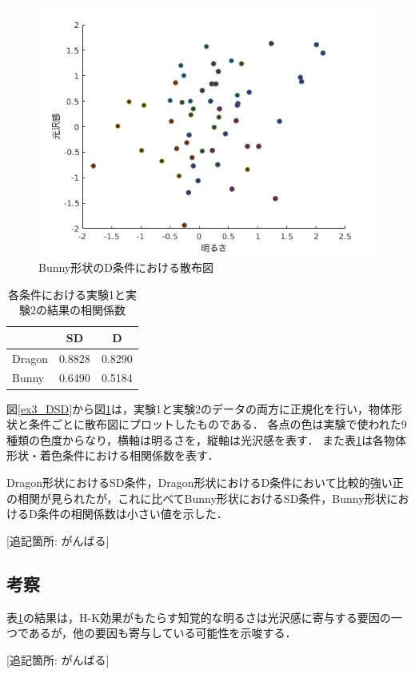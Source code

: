             \begin{figure}[h]
                \centering
                \includegraphics[width=12.0cm]{./img/ex3_BD.png}
                \caption{Bunny形状のD条件における散布図}
                \label{ex3_BD}
            \end{figure}

            \begin{table}[h]
                \centering
                \caption{各条件における実験1と実験2の結果の相関係数}
                \begin{tabular}{|l||c|c|} \hline
                                & SD       & D        \\ \hline \hline
                    Dragon      & 0.8828   & 0.8290   \\ \hline
                    Bunny       & 0.6490   & 0.5184   \\ \hline
                \end{tabular}
                \label{cc}
            \end{table}

            図\ref{ex3_DSD}から図\ref{ex3_BD}は，実験1と実験2のデータの両方に正規化を行い，物体形状と条件ごとに散布図にプロットしたものである．
            各点の色は実験で使われた9種類の色度からなり，横軸は明るさを，縦軸は光沢感を表す．
            また表\ref{cc}は各物体形状・着色条件における相関係数を表す．

            Dragon形状におけるSD条件，Dragon形状におけるD条件において比較的強い正の相関が見られたが，これに比べてBunny形状におけるSD条件，Bunny形状におけるD条件の相関係数は小さい値を示した．
            
            [追記箇所: がんばる]

        \subsection{考察}
        
            表\ref{cc}の結果は，H-K効果がもたらす知覚的な明るさは光沢感に寄与する要因の一つであるが，他の要因も寄与している可能性を示唆する．

            [追記箇所: がんばる]

    \newpage